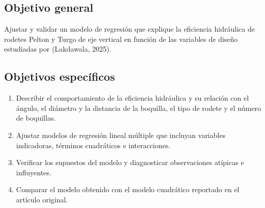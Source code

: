 \subsection{Objetivo general}

Ajustar y validar un modelo de regresión que explique la eficiencia hidráulica de rodetes Pelton y Turgo de eje vertical en función de las variables de diseño estudiadas por (Lakdawala, 2025).

\subsection{Objetivos específicos}

\begin{enumerate}[label=\arabic*.]
  \item Describir el comportamiento de la eficiencia hidráulica y su relación con el ángulo, el diámetro y la distancia de la boquilla, el tipo de rodete y el número de boquillas.
  \item Ajustar modelos de regresión lineal múltiple que incluyan variables indicadoras, términos cuadráticos e interacciones.
  \item Verificar los supuestos del modelo y diagnosticar observaciones atípicas e influyentes.
  \item Comparar el modelo obtenido con el modelo cuadrático reportado en el artículo original.
\end{enumerate}

